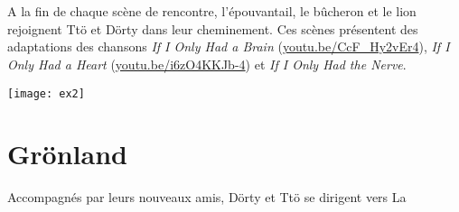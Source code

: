 \documentclass[a4paper]{article}
\newcommand{\mshrule}{}
\newcommand{\mssection}[1]{\section{#1}}
\begin{document}
\begin{comment}
\subsection*{Ttö}
\begin{center}
\begin{tabular}{|p{0.3\textwidth}|p{0.3\textwidth}|p{0.3\textwidth}|}\hline
Frizn (parlé) & Français (sous-titres) & Anglais (sous-titres) \\\hline
Sit frökn brökn strökn sit spöknfårs tökn kröknfårs nökn ökn kn k? &
Et si cette grenouille {\large Vous aimez le contenu de ce sous-titre~? Abonnez-vous
à l'édition web pour pouvoir lire le reste.} &
Perhaps we are that frog.  We change slowly, we fail to see what has
happened, and at the end, we die from first-degree burns in a pot of
scalding water.\\\hline
\end{tabular}
\end{center}

\subsection*{Dörty}
\begin{center}
\begin{tabular}{|p{0.3\textwidth}|p{0.3\textwidth}|p{0.3\textwidth}|}\hline
Frizn (parlé) & Français (sous-titres) & Anglais (sous-titres) \\\hline
Dörty lick sit herbe. &
J'aime l'herbe~!! &
I like grass.\\\hline
\end{tabular}
\end{center}\par

\hfill\\
\end{comment}
\mshrule
\\\hfill\\
A la fin de chaque scène de rencontre, l’épouvantail, le bûcheron et le
lion rejoignent Ttö et Dörty dans leur cheminement. Ces scènes
présentent des adaptations des chansons \emph{If I Only Had a Brain}
(\href{http://youtu.be/CcF_Hy2vEr4}{youtu.be/CcF\_Hy2vEr4}), \emph{If I Only
Had a Heart}
(\href{http://youtu.be/i6zO4KKJb-4}{youtu.be/i6zO4KKJb-4}) et \emph{If I
Only Had the Nerve}.
\begin{center}
\texttt{[image: ex2]}
\end{center}
\mssection{Grönland}
Accompagnés par leurs nouveaux amis, Dörty et Ttö se dirigent vers La 
\end{document}
